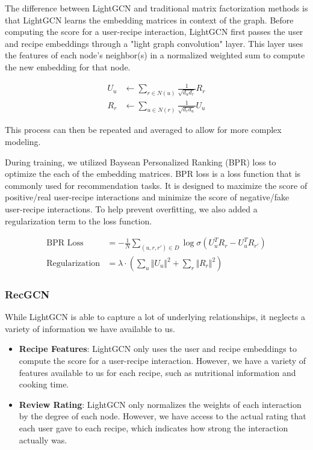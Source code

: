 \documentclass{article}
\begin{document}
The difference between LightGCN and traditional matrix factorization methods is that LightGCN learns the embedding matrices in context of the graph. Before computing the score for a user-recipe interaction, LightGCN first passes the user and recipe embeddings through a "light graph convolution" layer. This layer uses the features of each node's neighbor(s) in a normalized weighted sum to compute the new embedding for that node.

$$
  \begin{aligned}
    U_u & \gets \sum_{r \in N(u)} \frac{1}{\sqrt{d_u d_r}} R_r \\
    R_r & \gets \sum_{u \in N(r)} \frac{1}{\sqrt{d_r d_u}} U_u
  \end{aligned}
$$

This process can then be repeated and averaged to allow for more complex modeling.

During training, we utilized Baysean Personalized Ranking (BPR) loss to optimize the each of the embedding matrices. BPR loss is a loss function that is commonly used for recommendation tasks. It is designed to maximize the score of positive/real user-recipe interactions and minimize the score of negative/fake user-recipe interactions. To help prevent overfitting, we also added a regularization term to the loss function.

$$
  \begin{aligned}
    \text{BPR Loss}       & = -\frac{1}{N} \sum_{(u, r, r') \in D} \log \sigma(U_u^TR_r - U_u^TR_{r'})             \\
    \text{Regularization} & = \lambda \cdot \left( \sum_{u} \Vert U_u \Vert^2 + \sum_{r} \Vert R_r \Vert^2 \right)
  \end{aligned}
$$

\subsubsection{RecGCN}

While LightGCN is able to capture a lot of underlying relationships, it neglects a variety of information we have available to us.

\begin{itemize}
  \item \textbf{Recipe Features}: LightGCN only uses the user and recipe embeddings to compute the score for a user-recipe interaction. However, we have a variety of features available to us for each recipe, such as nutritional information and cooking time.
  \item \textbf{Review Rating}: LightGCN only normalizes the weights of each interaction by the degree of each node. However, we have access to the actual rating that each user gave to each recipe, which indicates how strong the interaction actually was.
\end{itemize}
\end{document}
